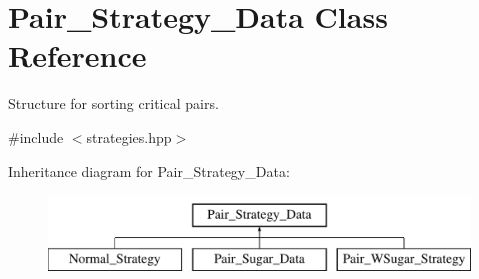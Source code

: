 \hypertarget{class_pair___strategy___data}{}\section{Pair\+\_\+\+Strategy\+\_\+\+Data Class Reference}
\label{class_pair___strategy___data}


Structure for sorting critical pairs.  




{\ttfamily \#include $<$strategies.\+hpp$>$}

Inheritance diagram for Pair\+\_\+\+Strategy\+\_\+\+Data\+:\begin{figure}[H]
\begin{center}
\leavevmode
\includegraphics[height=2.000000cm]{class_pair___strategy___data}
\end{center}
\end{figure}
